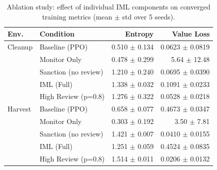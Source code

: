 \begin{table}[htbp]
\caption{Ablation study: effect of individual IML components on converged training metrics (mean $\pm$ std over 5 seeds).}
\label{tab:ablation}
\centering
\footnotesize
\begin{tabular}{llrr}
\toprule
\textbf{Env.} & \textbf{Condition} & \textbf{Entropy} & \textbf{Value Loss} \\
\midrule
  Cleanup & Baseline (PPO) & 0.510 $\pm$ 0.134 & 0.0623 $\pm$ 0.0819 \\
   & Monitor Only & 0.478 $\pm$ 0.299 & 5.64 $\pm$ 12.48 \\
   & Sanction (no review) & 1.210 $\pm$ 0.240 & 0.0695 $\pm$ 0.0390 \\
   & IML (Full) & 1.338 $\pm$ 0.032 & 0.1091 $\pm$ 0.0233 \\
   & High Review (p=0.8) & 1.276 $\pm$ 0.322 & 0.0528 $\pm$ 0.0218 \\
\midrule
  Harvest & Baseline (PPO) & 0.658 $\pm$ 0.077 & 0.4673 $\pm$ 0.0347 \\
   & Monitor Only & 0.303 $\pm$ 0.192 & 3.50 $\pm$ 7.81 \\
   & Sanction (no review) & 1.421 $\pm$ 0.007 & 0.0410 $\pm$ 0.0155 \\
   & IML (Full) & 1.251 $\pm$ 0.059 & 0.4524 $\pm$ 0.0835 \\
   & High Review (p=0.8) & 1.514 $\pm$ 0.011 & 0.0206 $\pm$ 0.0132 \\
\bottomrule
\end{tabular}
\end{table}
